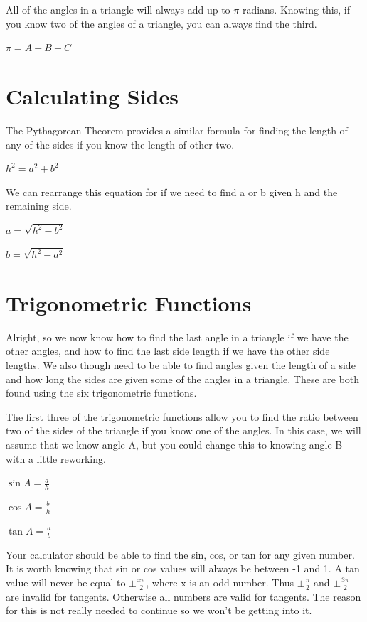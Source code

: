 \documentclass[]{book}
\begin{document}
All of the angles in a triangle will always add up to $\pi$ radians.
Knowing this, if you know two of the angles of a triangle, you can always
find the third.

\bigskip
$\pi = A+B+C$
\bigskip

\section{Calculating Sides}

The Pythagorean Theorem provides a similar formula for finding the length 
of any of the sides if you know the length of other two.

\bigskip
$h^2 = a^2 + b^2$
\bigskip

We can rearrange this equation for if we need to find a or b given h and
the remaining side.

\bigskip
$a = \sqrt{h^2 -b^2}$

\bigskip
$b = \sqrt{h^2 -a^2}$
\bigskip

\section{Trigonometric Functions}

Alright, so we now know how to find the last angle in a triangle if we
have the other angles, and how to find the last side length if we have
the other side lengths.  We also though need to be able to find angles
given the length of a side and how long the sides are given some of the 
angles in a triangle.  These are both found using the six trigonometric
functions.

The first three of the trigonometric functions allow you to find the ratio
between two of the sides of the triangle if you know one of the angles. In
this case, we will assume that we know angle A, but you could change this
to knowing angle B with a little reworking.

\bigskip
$\sin{A} = \frac{a}{h}$
\bigskip

$\cos{A} = \frac{b}{h}$
\bigskip

$\tan{A} = \frac{a}{b}$
\bigskip

Your calculator should be able to find the sin, cos, or tan for any given
number.  It is worth knowing that sin or cos values will always be
between -1 and 1.  A tan value will never be equal to $\pm \frac{x\pi}{2}$,
where x is an odd number. Thus $\pm\frac{\pi}{2}$ and $\pm\frac{3\pi}{2}$
are invalid for tangents. Otherwise all numbers are valid for tangents.
The reason for this is not really needed to continue so we won't be getting
into it.
\end{document}
